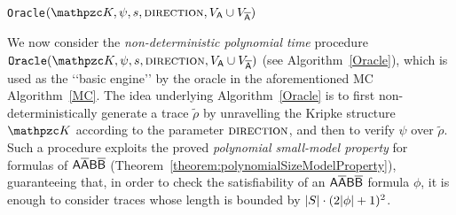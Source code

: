 \begin{algorithm}[tp]
\begin{algorithmic}[1]
    	\EndFor
\EndFor
{}
    	\EndFor
\EndFor

        \EndFor
        \EndFor        
        \EndFor
	    \EndFor
	\EndIf
\EndFor	
{}
\end{algorithmic}
\caption{\texttt{Oracle}$(\Ku,\psi,s,\textsc{direction},V_{\A}\cup V_{\Abar})$}\label{Oracle}
\end{algorithm}

We now consider the \emph{non-deterministic polynomial time} procedure $\texttt{Oracle}(\Ku,\allowbreak \psi,s, \textsc{direction}, V_{\A}\cup V_{\Abar})$ (see Algorithm~\ref{Oracle}), which is used as the \lq\lq basic engine\rq\rq{} by the oracle in the aforementioned MC Algorithm~\ref{MC}. 
The idea underlying Algorithm~\ref{Oracle} is to first non-deterministically generate a trace $\tilde{\rho}$ by unravelling the Kripke structure $\Ku$
according to the parameter $\textsc{direction}$, and then to verify $\psi$ over $\tilde{\rho}$.
%
Such a procedure exploits the proved \emph{polynomial small-model property} for formulas of $\mathsf{A\overline{A}B\overline{B}}$ (Theorem~\ref{theorem:polynomialSizeModelProperty}), 
guaranteeing that, in order to check the satisfiability of an $\mathsf{A\overline{A}B\overline{B}}$ formula $\phi$, it is enough to consider traces whose length is bounded by $|S|\cdot (2|\phi|+1)^2$. 

